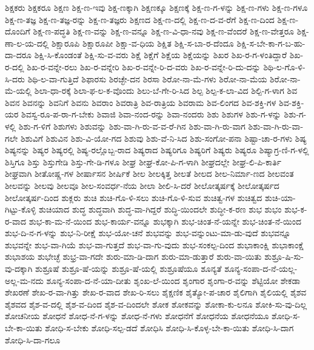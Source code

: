 {ಶಿಕ್ಷಕರು
ಶಿಕ್ಷಕರೂ
ಶಿಕ್ಷಣ
ಶಿಕ್ಷ-ಣ-ಇವು
ಶಿಕ್ಷ-ಣಕ್ಕಾಗಿ
ಶಿಕ್ಷಣಕ್ಕೂ
ಶಿಕ್ಷಣಕ್ಕೆ
ಶಿಕ್ಷ-ಣ-ಗ-ಳನ್ನು
ಶಿಕ್ಷ-ಣ-ಗಳು
ಶಿಕ್ಷ-ಣ-ಗಳೂ
ಶಿಕ್ಷ-ಣ-ತಜ್ಞ
ಶಿಕ್ಷ-ಣ-ತಜ್ಞ-ರನ್ನು
ಶಿಕ್ಷ-ಣ-ತಜ್ಞರು
ಶಿಕ್ಷಣದ
ಶಿಕ್ಷ-ಣ-ದಲ್ಲಿ
ಶಿಕ್ಷ-ಣ-ದ-ವ-ರೆಗೆ
ಶಿಕ್ಷ-ಣ-ದಿಂದ
ಶಿಕ್ಷ-ಣ-ದೊಂದಿಗೆ
ಶಿಕ್ಷ-ಣ-ಪದ್ಧತಿ
ಶಿಕ್ಷ-ಣ-ವನ್ನು
ಶಿಕ್ಷ-ಣ-ವನ್ನೂ
ಶಿಕ್ಷ-ಣ-ವಿ-ಧಾ-ನವು
ಶಿಕ್ಷ-ಣ-ವೆಂದರೆ
ಶಿಕ್ಷ-ಣ-ವೇತ್ತರೂ
ಶಿಕ್ಷ-ಣಾ-ಲ-ಯ-ದಲ್ಲಿ
ಶಿಕ್ಷಾರೂಪಿ
ಶಿಕ್ಷಾರೂಪೀ
ಶಿಕ್ಷಾ-ವ-ಧಿಯ
ಶಿಕ್ಷಿತ
ಶಿಕ್ಷಿ-ಸ-ಬಾ-ರ-ದೆಂದೂ
ಶಿಕ್ಷಿ-ಸ-ಬೇ-ಕಾ-ಗ-ಬ-ಹು-ದಾ-ದರೂ
ಶಿಕ್ಷಿ-ಸಿ-ಕೊಂಡಂತೆ
ಶಿಕ್ಷಿ-ಸು-ವ-ವರು
ಶಿಕ್ಷೆ
ಶಿಕ್ಷೆಗೆ
ಶಿಕ್ಷೆಯ
ಶಿಕ್ಷೆಯನ್ನು
ಶಿಖರ
ಶಿಖ-ರ-ಗ-ಳಂತಿದ್ದಾರೆ
ಶಿಖ-ರ-ದಲ್ಲಿ
ಶಿಖ-ರ-ವನ್ನೇ-ರಲು
ಶಿಖ-ರ-ವನ್ನೇರಿ
ಶಿಖ-ರ-ವನ್ನೇ-ರಿ-ದ-ವರು
ಶಿಖ-ರ-ವನ್ನೇ-ರಿ-ದು-ದನ್ನು
ಶಿಥಿ-ಲ-ಗೊ-ಳಿ-ಸಿ-ದರು
ಶಿಥಿ-ಲ-ವಾ-ಗುತ್ತಿದೆ
ಶಿಫಾರಸು
ಶಿರಚ್ಛೇ-ದನ
ಶಿರಸಾ
ಶಿರೋ-ನಾ-ಮೆ-ಗಳು
ಶಿರೋ-ನಾ-ಮೆಯ
ಶಿರೋ-ನಾ-ಮೆ-ಯಲ್ಲಿ
ಶಿಲಾ-ಧಾ-ರಕ್ಕೆ
ಶಿಲಾ-ಫ-ಲ-ಕ-ವೊಂದು
ಶಿಲು-ಬೆ-ಗೇ-ರಿ-ಸಿದ
ಶಿಲ್ಪ
ಶಿಲ್ಪ-ಕ-ಲಾ-ವಿದ
ಶಿಲ್ಪಿ-ಗ-ಳಾಗ
ಶಿವ
ಶಿವನ
ಶಿವನನ್ನು
ಶಿವನಿಗೆ
ಶಿವನು
ಶಿವರಾಂ
ಶಿವರಾತ್ರಿ
ಶಿವ-ರಾತ್ರಿಯ
ಶಿವರಾಮ
ಶಿವ-ಲಿಂಗದ
ಶಿವ-ಶಕ್ತಿ-ಗಳ
ಶಿವ-ಶಕ್ತಿ-ಯರ
ಶಿವಸ್ವ-ರೂ-ಪ-ರಾ-ಗ-ಬೇಕು
ಶಿವಾಜಿ
ಶಿವಾ-ನಂದ-ರನ್ನು
ಶಿವಾ-ನಂದರು
ಶಿಶು
ಶಿಶುಗಳ
ಶಿಶು-ಗ-ಳನ್ನು
ಶಿಶು-ಗ-ಳಲ್ಲಿ
ಶಿಶು-ಗ-ಳಿಗೆ
ಶಿಶುಗಳು
ಶಿಶುವನ್ನು
ಶಿಶು-ವಾ-ಗಿ-ರು-ವ-ವ-ರೆ-ಗಿನ
ಶಿಶು-ವಾ-ಗಿ-ರು-ವಾಗ
ಶಿಶು-ವಾ-ಗಿ-ರು-ವಾ-ಗಲೇ
ಶಿಶುವಿಗೆ
ಶಿಶುವಿನ
ಶಿಶು-ವಿ-ಯೋ-ಗದ
ಶಿಶುವು
ಶಿಶು-ವೆ-ನಿ-ಸಿದ
ಶಿಶು-ಸಂಗೋ-ಪನಾ
ಶಿಷ್ಟಾ-ಚಾ-ರ-ಗಳು
ಶಿಷ್ಯ
ಶಿಷ್ಯನನ್ನು
ಶಿಷ್ಯರ
ಶಿಷ್ಯರಲ್ಲಿ
ಶಿಷ್ಯ-ರಲ್ಲೊಬ್ಬ-ರಾದ
ಶಿಷ್ಯರಾದ
ಶಿಷ್ಯರಿಗೂ
ಶಿಷ್ಯರಿಗೆ
ಶಿಷ್ಯರು
ಶಿಷ್ಯರೂ
ಶಿಷ್ಯಾಗ್ರ-ಣಿ-ಗ-ಳಲ್ಲಿ
ಶಿಸ್ತಿಗೂ
ಶಿಸ್ತು
ಶಿಸ್ತುಗೇಡಿ
ಶಿಸ್ತು-ಗೇ-ಡಿ-ಗಳೂ
ಶೀಘ್ರ
ಶೀಘ್ರ-ಕೋ-ಪಿ-ಗ-ಳಾಗಿ
ಶೀಘ್ರದಲ್ಲೇ
ಶೀಘ್ರ-ಲಿ-ಪಿ-ಕಾರ್ತಿ
ಶೀಘ್ರವಾಗಿ
ಶೀತೋಷ್ಣ-ಗಳ
ಶೀರ್ಷಾಸನ
ಶೀರ್ಷಿಕೆ
ಶೀಲ
ಶೀಲಕ್ಕಿತ್ತ
ಶೀಲತೆ
ಶೀಲದ
ಶೀಲ-ನಿರ್ಮಾ-ಣದ
ಶೀಲವಂತ
ಶೀಲವನ್ನು
ಶೀಲವು
ಶೀಲವೂ
ಶೀಲ-ಸಂವರ್ಧ-ನೆಯ
ಶೀಲಾ
ಶೀಲಿ-ಸಿ-ದರೆ
ಶೀಲೋತ್ಕರ್ಷಕ್ಕೆ
ಶೀಲೋತ್ಕರ್ಷದ
ಶೀಲೋತ್ಕರ್ಷ-ದಿಂದ
ಶುಕ್ಲರು
ಶುಚಿ
ಶುಚಿ-ಗೊ-ಳಿ-ಸಲು
ಶುಚಿ-ಗೊ-ಳಿ-ಸುವ
ಶುಚಿತ್ವ-ಗಳ
ಶುಚಿತ್ವದ
ಶುಚಿ-ಯಾ-ಗಿಟ್ಟು-ಕೊಳ್ಳಿ
ಶುಚಿಯಾದ
ಶುದ್ಧ
ಶುದ್ಧವಾಗಿ
ಶುದ್ಧ-ವಾ-ಗಿದ್ದರೆ
ಶುದ್ಧಿ-ಯಿಂದಲೇ
ಶುದ್ಧೀ-ಕ-ರಣ
ಶುಭ
ಶುಭಂ
ಶುಭ-ಕ-ರ-ವಾದ
ಶುಭ-ಕಾ-ಮ-ನೆ-ಯಿಂದ
ಶುಭ-ಕಾರ್ಯ-ವನ್ನೂ
ಶುಭಕ್ಕಾಗಿ
ಶುಭ-ಚಿಂತ-ನೆ-ಯನ್ನೇ
ಶುಭ-ಚಿಂತ-ನೆ-ಯಿಂದ
ಶುಭ-ದಿ-ನ-ಗ-ಳನ್ನು
ಶುಭ-ನಿ-ರೀಕ್ಷೆ
ಶುಭ-ಯೋ-ಚನೆ
ಶುಭವನ್ನು
ಶುಭ-ವನ್ನುಂಟು-ಮಾ-ಡು-ವುದೆ
ಶುಭವನ್ನೂ
ಶುಭವನ್ನೇ
ಶುಭ-ವಾ-ಗಿಯೆ
ಶುಭ-ವಾ-ಗುತ್ತದೆ
ಶುಭ-ವಾ-ಗು-ವುದು
ಶುಭ-ಸಂಕಲ್ಪ-ದಿಂದ
ಶುಭಾಕಾಂಕ್ಷಿ
ಶುಭಾಕಾಂಕ್ಷೆ
ಶುಭಾಶಯ
ಶುಭೇಚ್ಛೆ
ಶುಭ್ರ-ವಾ-ಗದೇ
ಶುರು-ಮಾ-ಡಿ-ದಾಗ
ಶುರು-ಮಾ-ಡುತ್ತಾರೆ
ಶುರು-ವಾ-ಯಿತು
ಶುಶ್ರೂ-ಷಿ-ಸು-ವು-ದಕ್ಕಾಗಿ
ಶುಶ್ರೂಷೆ
ಶುಶ್ರೂ-ಷೆ-ಯನ್ನು
ಶುಶ್ರೂ-ಷೆ-ಯಲ್ಲಿ
ಶುಶ್ರೂಷೆಯೂ
ಶೂನ್ಯತೆ
ಶೂನ್ಯ-ಸಂಪಾ-ದ-ನೆ-ಯಲ್ಲ-ಅಲ್ಲ-ಮ-ನದು
ಶೂನ್ಯ-ಸಂಪಾ-ದ-ನೆ-ಯಾ-ದೀತು
ಶೃಂಖ-ಲೆ-ಯಿಂದ
ಶೃಂಗಾರ
ಶೃಂಗಾ-ರ-ವನ್ನು
ಶೆಟ್ಟಿಯೋ
ಶೇಕಡಾ
ಶೇಖರಣೆ
ಶೇಖ-ರ-ವಾ-ಗಿತ್ತು
ಶೇಖ-ರ-ವಾದ
ಶೇಖ-ರಿ-ಸಲು
ಶೈಕ್ಷಣಿಕ
ಶೈತ್ಯೋ-ಪ-ಚಾರ
ಶೈಲಿಗಾಗಿ
ಶೈಲಿಯಲ್ಲಿ
ಶೈಶವ
ಶೈಶವದ
ಶೈಶ-ವ-ದಲ್ಲಿ
ಶೈಶ-ವ-ದಿಂದ
ಶೈಶ-ವ-ದಿಂದಲೇ
ಶೋಕ
ಶೋಕವನ್ನು
ಶೋಕಾ-ಕು-ಲನೂ
ಶೋಕಿ-ಸು-ವು-ದಿಲ್ಲ
ಶೋಚನೀಯ
ಶೋಧನೆ
ಶೋಧ-ನೆ-ಗ-ಳನ್ನು
ಶೋಧ-ನೆ-ಗಳು
ಶೋಧನೆಗೆ
ಶೋಧನೆಯ
ಶೋಧನೆಯೂ
ಶೋಧಿ-ಸ-ಬೇ-ಕಾ-ಯಿತು
ಶೋಧಿ-ಸ-ಬೇಕು
ಶೋಧಿ-ಸಲ್ಪ-ಡದೆ
ಶೋಧಿಸಿ
ಶೋಧಿ-ಸಿ-ಕೊಳ್ಳ-ಬೇ-ಕಾ-ಯಿತು
ಶೋಧಿ-ಸಿ-ದಾಗ
ಶೋಧಿ-ಸಿ-ದಾ-ಗಲೂ
}
